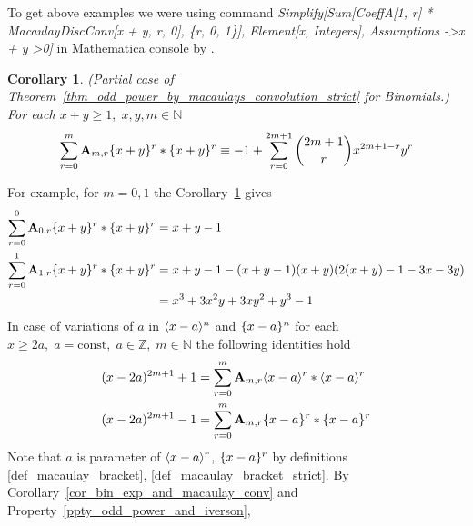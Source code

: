 \documentclass[12pt,letterpaper,oneside,reqno]{amsart}
\newcommand \anglePower [2]{\langle #1 \rangle \sp{#2}}
\newcommand \curvePower [2]{\{#1\}\sp{#2}}
\newcommand \coeffA [3][A] {{\mathbf{#1}} \sb{#2,#3}}
\newtheorem{cor}[thm]{Corollary}
\numberwithin{equation}{section}
\begin{document}
    To get above examples we were using command \textit{Simplify[Sum[CoeffA[1, r] * MacaulayDiscConv[x + y, r, 0],
        \{r, 0, 1\}], Element[x, Integers], Assumptions -\textgreater x + y \textgreater 0]} in Mathematica
    console by \cite{mmca_package}.
    \begin{cor}
        \label{cor_bin_exp_and_macaulay_conv_strict}
        (Partial case of Theorem~\ref{thm_odd_power_by_macaulays_convolution_strict} for Binomials.)
        For each $x+y\geq 1, \; x,y,m\in\mathbb{N}$
        \begin{equation*}
            \sum_{r=0}^{m} \coeffA{m}{r} \curvePower{x+y}{r} \ast \curvePower{x+y}{r}
            \equiv
            -1 + \sum_{r=0}^{2m+1} \binom{2m+1}{r} x^{2m+1-r} y^r
        \end{equation*}
    \end{cor}
    For example, for $m=0,1$ the Corollary~\ref{cor_bin_exp_and_macaulay_conv_strict} gives
    \begin{equation*}
        \begin{split}
            \sum_{r=0}^{0} \coeffA{0}{r} \curvePower{x+y}{r} \ast \curvePower{x+y}{r}
            &= x + y - 1 \\
            \sum_{r=0}^{1} \coeffA{1}{r} \curvePower{x+y}{r} \ast \curvePower{x+y}{r}
            &= x + y - 1 - (x + y - 1) (x + y) (2 (x + y)-1 - 3 x - 3 y) \\
            &= x^3 + 3 x^2 y + 3 x y^2 + y^3 - 1
        \end{split}
    \end{equation*}
    In case of variations of $a$ in $\anglePower{x-a}{n}$ and $\curvePower{x-a}{n}$
    for each $x \geq 2a, \; a = \mathrm{const}, \; a\in\mathbb{Z}, \; m\in\mathbb{N}$ the following identities hold
    \begin{equation*}
        \begin{split}
            (x-2a)^{2m+1} + 1
            &=\sum_{r=0}^{m} \coeffA{m}{r} \anglePower{x-a}{r} \ast \anglePower{x-a}{r} \\
            (x-2a)^{2m+1} - 1
            &=\sum_{r=0}^{m} \coeffA{m}{r} \curvePower{x-a}{r} \ast \curvePower{x-a}{r}
        \end{split}
    \end{equation*}
    Note that $a$ is parameter of $\anglePower{x-a}{r}$, $\curvePower{x-a}{r}$ by definitions
    \eqref{def_macaulay_bracket}, \eqref{def_macaulay_bracket_strict}.
    By Corollary~\ref{cor_bin_exp_and_macaulay_conv} and Property~\ref{ppty_odd_power_and_iverson},
\end{document}
